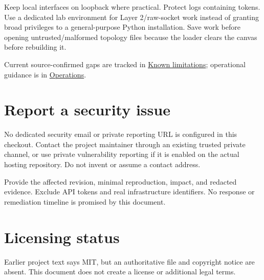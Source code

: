 Keep local interfaces on loopback where practical. Protect logs containing tokens. Use a dedicated lab environment for Layer 2/raw-socket work instead of granting broad privileges to a general-purpose Python installation. Save work before opening untrusted/malformed topology files because the loader clears the canvas before rebuilding it.

Current source-confirmed gaps are tracked in \hyperref[chapter-16]{Known limitations}; operational guidance is in \hyperref[chapter-11]{Operations}.

\section*{Report a security issue}
No dedicated security email or private reporting URL is configured in this checkout. Contact the project maintainer through an existing trusted private channel, or use private vulnerability reporting if it is enabled on the actual hosting repository. Do not invent or assume a contact address.

Provide the affected revision, minimal reproduction, impact, and redacted evidence. Exclude API tokens and real infrastructure identifiers. No response or remediation timeline is promised by this document.

\section*{Licensing status}
Earlier project text says MIT, but an authoritative  file and copyright notice are absent. This document does not create a license or additional legal terms.

